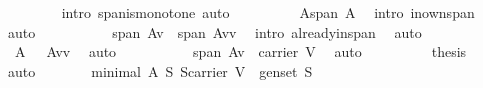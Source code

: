 \begin{isabellebody}
\ \ \ \ \ \ \ \isamarkupfalse%
\ {\isacharparenleft}intro\ span{\isacharunderscore}is{\isacharunderscore}monotone{\isacharcomma}\ auto{\isacharparenright}\isanewline
\ \ \ \ \isamarkupfalse%
\ {}\ \isamarkupfalse%
\ {}{\isacharcolon}\ {\isachardoublequoteopen}A{\isasymsubseteq}span\ A{\isachardoublequoteclose}\ \isamarkupfalse%
\ {\isacharparenleft}intro\ in{\isacharunderscore}own{\isacharunderscore}span{\isacharparenright}\ \isamarkupfalse%
\ auto\isanewline
\ \ \ \ \isamarkupfalse%
\ {}\ {}{}\ \isamarkupfalse%
\ {}{\isacharcolon}\ {\isachardoublequoteopen}span\ {\isacharparenleft}A{\isacharminus}{\isacharbraceleft}v{\isacharbraceright}{\isacharparenright}\ {\isacharequal}\ span\ {\isacharparenleft}{\isacharparenleft}A{\isacharminus}{\isacharbraceleft}v{\isacharbraceright}{\isacharparenright}{\isasymunion}{\isacharbraceleft}v{\isacharbraceright}{\isacharparenright}{\isachardoublequoteclose}\ \isamarkupfalse%
\ {\isacharparenleft}intro\ already{\isacharunderscore}in{\isacharunderscore}span{\isacharparenright}\ \isamarkupfalse%
\ auto\isanewline
\ \ \ \ \isamarkupfalse%
\ {}\ \isamarkupfalse%
\ {}{\isacharcolon}\ {\isachardoublequoteopen}A\ {\isacharequal}\ \ {\isacharparenleft}{\isacharparenleft}A{\isacharminus}{\isacharbraceleft}v{\isacharbraceright}{\isacharparenright}{\isasymunion}{\isacharbraceleft}v{\isacharbraceright}{\isacharparenright}{\isachardoublequoteclose}\ \isamarkupfalse%
\ auto\isanewline
\ \ \ \ \isamarkupfalse%
\ {}\ {}\ {}\ \isamarkupfalse%
\ {}{\isacharcolon}{\isachardoublequoteopen}span\ {\isacharparenleft}A{\isacharminus}{\isacharbraceleft}v{\isacharbraceright}{\isacharparenright}\ {\isacharequal}\ carrier\ V{\isachardoublequoteclose}\ \isamarkupfalse%
\ auto\ \isanewline
\ \ \ \ \isamarkupfalse%
\ {}\ \isamarkupfalse%
\ {\isacharquery}thesis\ \ \isamarkupfalse%
\ auto\isanewline
\ \ \isamarkupfalse%
\isanewline
\ \ \isamarkupfalse%
\ {}{}{\isacharcolon}\ {\isachardoublequoteopen}{\isasymnot}{\isacharparenleft}minimal\ A\ {\isacharparenleft}{\isasymlambda}S{\isachardot}\ S{\isasymsubseteq}carrier\ V\ {\isasymand}\ gen{\isacharunderscore}set\ S{\isacharparenright}{\isacharparenright}{\isachardoublequoteclose}\isanewline

\end{isabellebody}
